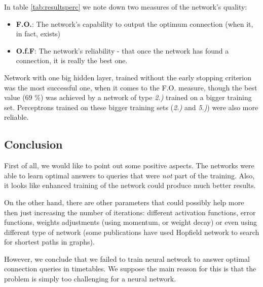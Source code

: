     \noindent In table \ref{tab:resultsperc} we note down two measures of the network's quality:
    \begin{itemize}
    	\item \textbf{F.O.}: The network's capability to output the optimum connection (when it, in fact, exists)
    	\item \textbf{O.f.F}: The network's reliability - that once the network has found a connection, it is really the best one.
    \end{itemize}
    \hspace{\fill}
    
    \noindent Network with one big hidden layer, trained without the early stopping criterion was the most successful one, when it comes to the F.O. measure, though the best value (69 \%) was achieved by a network of type \textit{2.)} trained on a bigger training set. Perceptrons trained on these bigger training sets (\textit{2.)} and \textit{5.)}) were also more reliable.
	
\subsection{Conclusion}
	
	First of all, we would like to point out some positive aspects. The networks were able to learn optimal answers to queries that were \textit{not} part of the training. Also, it looks like enhanced training of the network could produce much better results.
	
	On the other hand, there are other parameters that could possibly help more then just increasing the number of iterations: different activation functions, error functions, weights adjustments (using momentum, or weight decay) or even using different type of network (some publications have used Hopfield network to search for shortest paths in graphs). 
	
	However, we conclude that we failed to train neural network to answer optimal connection queries in timetables. We suppose the main reason for this is that the problem is simply too challenging for a neural network.